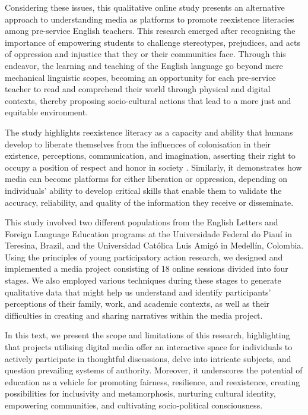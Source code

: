 \documentclass[english]{textolivre}
\begin{document}
Considering these issues, this qualitative online study presents an alternative approach to understanding media as platforms to promote reexistence literacies among pre-service English teachers. This research emerged after recognising the importance of empowering students to challenge stereotypes, prejudices, and acts of oppression and injustice that they or their communities face. Through this endeavor, the learning and teaching of the English language go beyond mere mechanical linguistic scopes, becoming an opportunity for each pre-service teacher to read and comprehend their world through physical and digital contexts, thereby proposing socio-cultural actions that lead to a more just and equitable environment.

The study highlights reexistence literacy as a capacity and ability that humans develop to liberate themselves from the influences of colonisation in their existence, perceptions, communication, and imagination, asserting their right to occupy a position of respect and honor in society \cite{alban2017,silva-souza2009letramentos,opendemocracy2022resistencia}. Similarly, it demonstrates how media can become platforms for either liberation or oppression, depending on individuals’ ability to develop critical skills that enable them to validate the accuracy, reliability, and quality of the information they receive or disseminate.

This study involved two different populations from the English Letters and Foreign Language Education programs at the Universidade Federal do Piauí in Teresina, Brazil, and the Universidad Católica Luis Amigó in Medellín, Colombia. Using the principles of young participatory action research, we designed and implemented a media project consisting of 18 online sessions divided into four stages. We also employed various techniques during these stages to generate qualitative data that might help us understand and identify participants’ perceptions of their family, work, and academic contexts, as well as their difficulties in creating and sharing narratives within the media project.

In this text, we present the scope and limitations of this research, highlighting that projects utilising digital media offer an interactive space for individuals to actively participate in thoughtful discussions, delve into intricate subjects, and question prevailing systems of authority. Moreover, it underscores the potential of education as a vehicle for promoting fairness, resilience, and reexistence, creating possibilities for inclusivity and metamorphosis, nurturing cultural identity, empowering communities, and cultivating socio-political consciousness.
\end{document}
